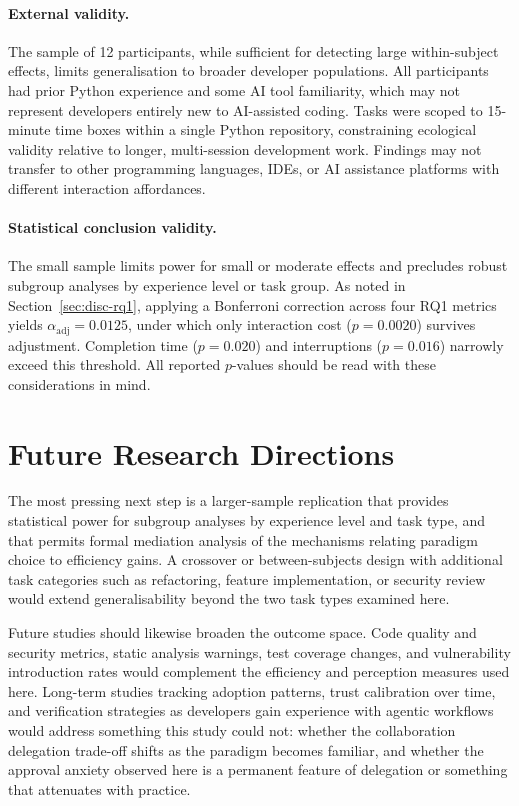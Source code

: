 \paragraph{External validity.} The sample of 12 participants, while sufficient for detecting large within-subject effects, limits generalisation to broader developer populations. All participants had prior Python experience and some AI tool familiarity, which may not represent developers entirely new to AI-assisted coding. Tasks were scoped to 15-minute time boxes within a single Python repository, constraining ecological validity relative to longer, multi-session development work. Findings may not transfer to other programming languages, IDEs, or AI assistance platforms with different interaction affordances.

\paragraph{Statistical conclusion validity.} The small sample limits power for small or moderate effects and precludes robust subgroup analyses by experience level or task group. As noted in Section~\ref{sec:disc-rq1}, applying a Bonferroni correction across four RQ1 metrics yields $\alpha_{\text{adj}} = 0.0125$, under which only interaction cost ($p=0.0020$) survives adjustment. Completion time ($p=0.020$) and interruptions ($p=0.016$) narrowly exceed this threshold. All reported $p$-values should be read with these considerations in mind.


\section{Future Research Directions}

\label{sec:disc-future}

The most pressing next step is a larger-sample replication that provides statistical power for subgroup analyses by experience level and task type, and that permits formal mediation analysis of the mechanisms relating paradigm choice to efficiency gains. A crossover or between-subjects design with additional task categories such as refactoring, feature implementation, or security review would extend generalisability beyond the two task types examined here.

Future studies should likewise broaden the outcome space. Code quality and security metrics, static analysis warnings, test coverage changes, and vulnerability introduction rates \parencite{perry2023insecure, qodo2025codequality} would complement the efficiency and perception measures used here. Long-term studies tracking adoption patterns, trust calibration over time, and verification strategies as developers gain experience with agentic workflows would address something this study could not: whether the collaboration delegation trade-off shifts as the paradigm becomes familiar, and whether the approval anxiety observed here is a permanent feature of delegation or something that attenuates with practice.
